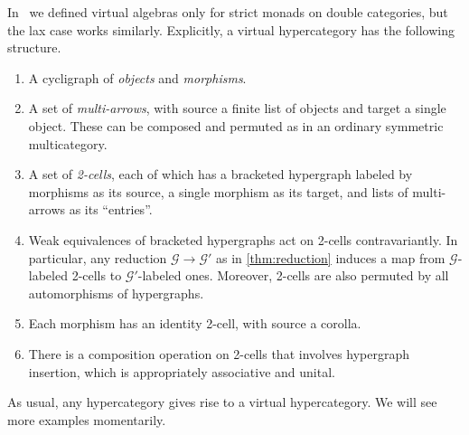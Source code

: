 \documentclass{article}
\theoremstyle{definition}
\newtheorem{defn}[thm]{Definition}
\theoremstyle{remark}
\def\M{\mathbb{M}}
\def\G{\mathcal{G}}
\begin{document}
In~\cite{cs:multicats} we defined virtual algebras only for strict monads on double categories, but the lax case works similarly.
Explicitly, a virtual hypercategory has the following structure.
\begin{enumerate}
\item A cycligraph of \emph{objects} and \emph{morphisms}.
\item A set of \emph{multi-arrows}, with source a finite list of objects and target a single object.
  These can be composed and permuted as in an ordinary symmetric multicategory.
\item A set of \emph{2-cells}, each of which has a bracketed hypergraph labeled by morphisms as its source, a single morphism as its target, and lists of multi-arrows as its ``entries''.
\item Weak equivalences of bracketed hypergraphs act on 2-cells contravariantly.
  In particular, any reduction $\G\to \G'$ as in \cref{thm:reduction} induces a map from $\G$-labeled 2-cells to $\G'$-labeled ones.
  Moreover, 2-cells are also permuted by all automorphisms of hypergraphs.
\item Each morphism has an identity 2-cell, with source a corolla.
\item There is a composition operation on 2-cells that involves hypergraph insertion, which is appropriately associative and unital.
\end{enumerate}

As usual, any hypercategory gives rise to a virtual hypercategory.
We will see more examples momentarily.


\end{document}
